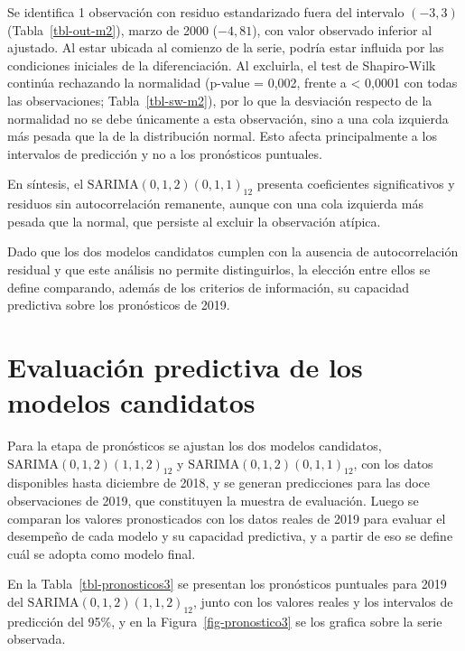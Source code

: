 \documentclass[
  spanish,
  11pt,
  letterpaper,
  DIV=11,
  numbers=noendperiod]{scrartcl}
\begin{document}
Se identifica 1 observación con residuo estandarizado fuera del
intervalo \((-3, 3)\) (Tabla~\ref{tbl-out-m2}), marzo de 2000
(\(-4{,}81\)), con valor observado inferior al ajustado. Al estar
ubicada al comienzo de la serie, podría estar influida por las
condiciones iniciales de la diferenciación. Al excluirla, el test de
Shapiro-Wilk continúa rechazando la normalidad (p-value = 0,002, frente
a \textless{} 0,0001 con todas las observaciones;
Tabla~\ref{tbl-sw-m2}), por lo que la desviación respecto de la
normalidad no se debe únicamente a esta observación, sino a una cola
izquierda más pesada que la de la distribución normal. Esto afecta
principalmente a los intervalos de predicción y no a los pronósticos
puntuales.

En síntesis, el \(\text{SARIMA}(0,1,2)(0,1,1)_{12}\) presenta
coeficientes significativos y residuos sin autocorrelación remanente,
aunque con una cola izquierda más pesada que la normal, que persiste al
excluir la observación atípica.

Dado que los dos modelos candidatos cumplen con la ausencia de
autocorrelación residual y que este análisis no permite distinguirlos,
la elección entre ellos se define comparando, además de los criterios de
información, su capacidad predictiva sobre los pronósticos de 2019.

\section{Evaluación predictiva de los modelos
candidatos}\label{evaluaciuxf3n-predictiva-de-los-modelos-candidatos}

Para la etapa de pronósticos se ajustan los dos modelos candidatos,
\(\text{SARIMA}(0,1,2)(1,1,2)_{12}\) y
\(\text{SARIMA}(0,1,2)(0,1,1)_{12}\), con los datos disponibles hasta
diciembre de 2018, y se generan predicciones para las doce observaciones
de 2019, que constituyen la muestra de evaluación. Luego se comparan los
valores pronosticados con los datos reales de 2019 para evaluar el
desempeño de cada modelo y su capacidad predictiva, y a partir de eso se
define cuál se adopta como modelo final.

En la Tabla~\ref{tbl-pronosticos3} se presentan los pronósticos
puntuales para 2019 del \(\text{SARIMA}(0,1,2)(1,1,2)_{12}\), junto con
los valores reales y los intervalos de predicción del 95\%, y en la
Figura~\ref{fig-pronostico3} se los grafica sobre la serie observada.
\end{document}
